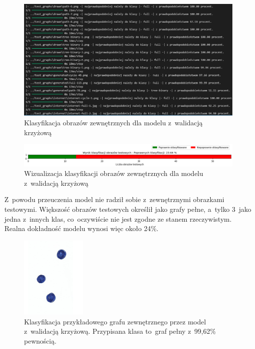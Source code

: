 \begin{figure}[ht]
	\centering
	\includegraphics[width=15.5cm]{resources/tests/images/v3/crossvalid_txt.png}
	\caption{Klasyfikacja obrazów zewnętrznych dla modelu z~walidacją krzyżową}
	\label{Fig:tests-cv-0b}
\end{figure}
\FloatBarrier

\begin{figure}[ht]
	\centering
	\includegraphics[width=15.5cm]{resources/tests/images/v3/crossvalid_bar.png}
	\caption{Wizualizacja klasyfikacji obrazów zewnętrznych dla modelu z~walidacją krzyżową}
	\label{Fig:tests-cv-0c}
\end{figure}
\FloatBarrier

Z~powodu przeuczenia model nie radził sobie z~zewnętrznymi obrazkami testowymi.
Większość obrazów testowych określił jako grafy pełne, a~tylko 3~jako jedna z~innych klas,
co~oczywiście nie jest zgodne ze stanem rzeczywistym.
Realna dokładność modelu wynosi więc około 24\%.

\begin{figure}[ht]
	\centering
	\includegraphics[height=4cm]{../graph_classification/test_graphs/drawn/empty-1.png}
	\caption{Klasyfikacja przykładowego grafu zewnętrznego przez model z~walidacją krzyżową.
		Przypisana klasa to~graf pełny z~99,62\% pewnością.}
	\label{Fig:tests-cv-0d}
\end{figure}
\FloatBarrier


